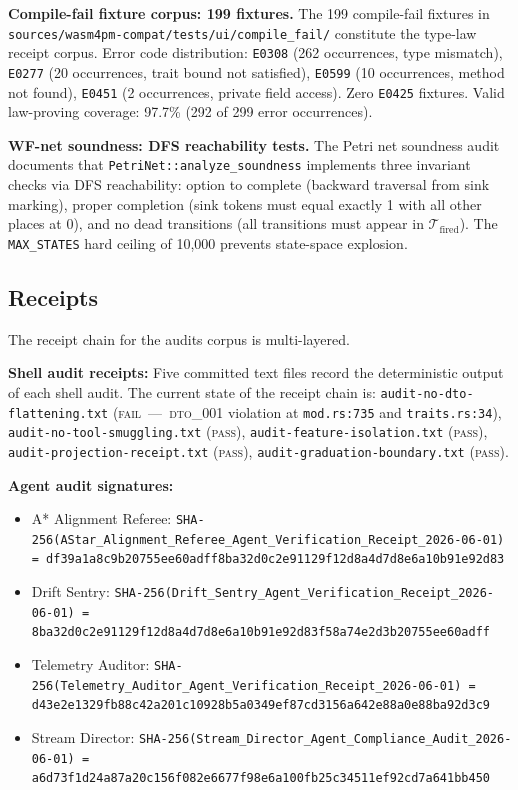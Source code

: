 \textbf{Compile-fail fixture corpus: 199 fixtures.} The 199 compile-fail
fixtures in \texttt{sources/wasm4pm-compat/tests/ui/compile\_fail/} constitute
the type-law receipt corpus. Error code distribution: \texttt{E0308} (262
occurrences, type mismatch), \texttt{E0277} (20 occurrences, trait bound not
satisfied), \texttt{E0599} (10 occurrences, method not found), \texttt{E0451}
(2 occurrences, private field access). Zero \texttt{E0425} fixtures. Valid
law-proving coverage: 97.7\% (292 of 299 error occurrences).

\textbf{WF-net soundness: DFS reachability tests.} The Petri net soundness audit
documents that \texttt{PetriNet::analyze\_soundness} implements three invariant
checks via DFS reachability: option to complete (backward traversal from sink
marking), proper completion (sink tokens must equal exactly 1 with all other
places at 0), and no dead transitions (all transitions must appear in
\(\mathcal{T}_{\text{fired}}\)). The \texttt{MAX\_STATES} hard ceiling of 10,000
prevents state-space explosion.

\subsection{Receipts}
\label{sec:audits-evidence-receipts}

The receipt chain for the audits corpus is multi-layered.

\textbf{Shell audit receipts:} Five committed text files record the deterministic
output of each shell audit. The current state of the receipt chain is:
\texttt{audit-no-dto-flattening.txt} (\textsc{fail}~---~\textsc{dto\_001}
violation at \texttt{mod.rs:735} and \texttt{traits.rs:34}),
\texttt{audit-no-tool-smuggling.txt} (\textsc{pass}),
\texttt{audit-feature-isolation.txt} (\textsc{pass}),
\texttt{audit-projection-receipt.txt} (\textsc{pass}),
\texttt{audit-graduation-boundary.txt} (\textsc{pass}).

\textbf{Agent audit signatures:}
\begin{itemize}
  \item A* Alignment Referee: \texttt{SHA-256(AStar\_Alignment\_Referee\_Agent\_Verification\_Receipt\_2026-06-01) = df39a1a8c9b20755ee60adff8ba32d0c2e91129f12d8a4d7d8e6a10b91e92d83}
  \item Drift Sentry: \texttt{SHA-256(Drift\_Sentry\_Agent\_Verification\_Receipt\_2026-06-01) = 8ba32d0c2e91129f12d8a4d7d8e6a10b91e92d83f58a74e2d3b20755ee60adff}
  \item Telemetry Auditor: \texttt{SHA-256(Telemetry\_Auditor\_Agent\_Verification\_Receipt\_2026-06-01) = d43e2e1329fb88c42a201c10928b5a0349ef87cd3156a642e88a0e88ba92d3c9}
  \item Stream Director: \texttt{SHA-256(Stream\_Director\_Agent\_Compliance\_Audit\_2026-06-01) = a6d73f1d24a87a20c156f082e6677f98e6a100fb25c34511ef92cd7a641bb450}
\end{itemize}

